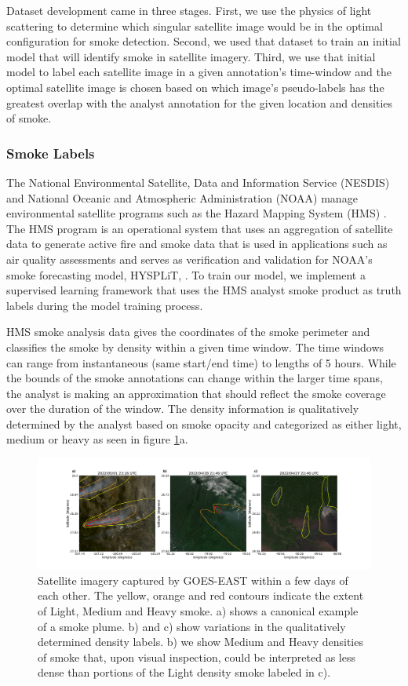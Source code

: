 \documentclass{ametsocV6.1}
\begin{document}
Dataset development came in three stages. First, we use the physics of light scattering to determine which singular satellite image would be in the optimal configuration for smoke detection. Second, we used that dataset to train an initial model that will identify smoke in satellite imagery. Third, we use that initial model to label each satellite image in a given annotation's time-window and the optimal satellite image is chosen based on which image's pseudo-labels has the greatest overlap with the analyst annotation for the given location and densities of smoke.

\subsubsection*{Smoke Labels} 
The National Environmental Satellite, Data and Information Service (NESDIS) and National Oceanic and Atmospheric Administration (NOAA) manage environmental satellite programs such as the Hazard Mapping System (HMS) \citep{hms, hms_val}. The HMS program is an operational system that uses an aggregation of satellite data to generate active fire and smoke data that is used in applications such as air quality assessments and serves as verification and validation for NOAA's smoke forecasting model, HYSPLiT, \citep{hysplit_ver}. To train our model, we implement a supervised learning framework that uses the HMS analyst smoke product as truth labels during the model training process.

HMS smoke analysis data gives the coordinates of the smoke perimeter and classifies the smoke by density within a given time window. The time windows can range from instantaneous (same start/end time) to lengths of 5 hours. While the bounds of the smoke annotations can change within the larger time spans, the analyst is making an approximation that should reflect the smoke coverage over the duration of the window. The density information is qualitatively determined by the analyst based on smoke opacity and categorized as either light, medium or heavy as seen in figure \ref{densities}a.

\begin{figure}
    \centering
    \includegraphics[width=15cm]{figures/Misclassified.png}
    \caption{Satellite imagery captured by GOES-EAST within a few days of each other. The yellow, orange and red contours indicate the extent of Light, Medium and Heavy smoke.  a) shows a canonical example of a smoke plume. b) and c) show variations in the qualitatively determined density labels. b) we show Medium and Heavy densities of smoke that, upon visual inspection, could be interpreted as less dense than portions of the Light density smoke labeled in c).}\label{densities}
\end{figure}
\end{document}
